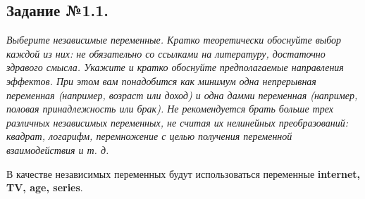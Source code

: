 \documentclass[a4paper,12pt]{article}
\begin{document}
	\subsection{Задание №1.1.}
	\textit{
			Выберите независимые переменные. Кратко теоретически обоснуйте выбор каждой из них: не обязательно со ссылками на литературу, достаточно здравого смысла. Укажите и кратко обоснуйте предполагаемые направления эффектов. При этом вам понадобится как минимум одна непрерывная переменная (например, возраст или доход) и одна дамми переменная (например, половая принадлежность или брак). Не рекомендуется брать больше трех различных независимых переменных, не считая их нелинейных преобразований: квадрат, логарифм, перемножение с целью получения переменной взаимодействия и т. д.
	}
	
	\vspace{0.2cm}
	
	В качестве независимых переменных будут использоваться переменные \textbf{internet, TV, age, series}.
	
\end{document}
